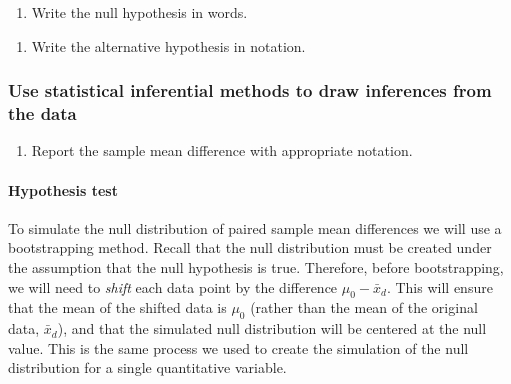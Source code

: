 \documentclass[
]{report}
\providecommand{\tightlist}{%
  \setlength{\itemsep}{0pt}\setlength{\parskip}{0pt}}
\begin{document}
\begin{enumerate}
\def\labelenumi{\arabic{enumi}.}
\setcounter{enumi}{2}
\tightlist
\item
  Write the null hypothesis in words.
\end{enumerate}

\vspace{0.8in}

\begin{enumerate}
\def\labelenumi{\arabic{enumi}.}
\setcounter{enumi}{3}
\tightlist
\item
  Write the alternative hypothesis in notation.
\end{enumerate}

\vspace{0.3in}

\subsubsection*{Use statistical inferential methods to draw inferences from the data}\label{use-statistical-inferential-methods-to-draw-inferences-from-the-data-2}

\begin{enumerate}
\def\labelenumi{\arabic{enumi}.}
\setcounter{enumi}{4}
\tightlist
\item
  Report the sample mean difference with appropriate notation.
\end{enumerate}

\vspace{0.2in}

\paragraph*{Hypothesis test}\label{hypothesis-test-3}

To simulate the null distribution of paired sample mean differences we will use a bootstrapping method. Recall that the null distribution must be created under the assumption that the null hypothesis is true. Therefore, before bootstrapping, we will need to \emph{shift} each data point by the difference \(\mu_0 - \bar{x}_d\). This will ensure that the mean of the shifted data is \(\mu_0\) (rather than the mean of the original data, \(\bar{x}_d\)), and that the simulated null distribution will be centered at the null value. This is the same process we used to create the simulation of the null distribution for a single quantitative variable.
\end{document}
